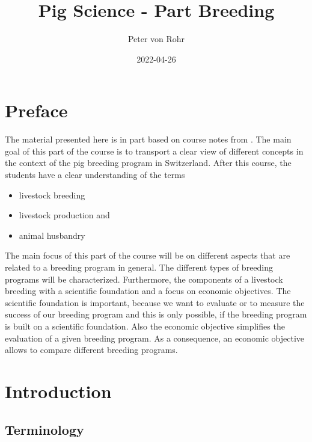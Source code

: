 \documentclass[
]{book}
\title{Pig Science - Part Breeding}
\author{Peter von Rohr}
\date{2022-04-26}
\providecommand{\tightlist}{%
  \setlength{\itemsep}{0pt}\setlength{\parskip}{0pt}}
\begin{document}
\maketitle

{
\setcounter{tocdepth}{1}
\tableofcontents
}
\hypertarget{preface}{%
\chapter*{Preface}\label{preface}}

The material presented here is in part based on course notes from \citep{Goetz2014}. The main goal of this part of the course is to transport a clear view of different concepts in the context of the pig breeding program in Switzerland. After this course, the students have a clear understanding of the terms

\begin{itemize}
\tightlist
\item
  livestock breeding
\item
  livestock production and
\item
  animal husbandry
\end{itemize}

The main focus of this part of the course will be on different aspects that are related to a breeding program in general. The different types of breeding programs will be characterized. Furthermore, the components of a livestock breeding with a scientific foundation and a focus on economic objectives. The scientific foundation is important, because we want to evaluate or to measure the success of our breeding program and this is only possible, if the breeding program is built on a scientific foundation. Also the economic objective simplifies the evaluation of a given breeding program. As a consequence, an economic objective allows to compare different breeding programs.

\hypertarget{gel-intro}{%
\chapter{Introduction}\label{gel-intro}}

\hypertarget{gel-intro-terminology}{%
\section{Terminology}\label{gel-intro-terminology}}
\end{document}
